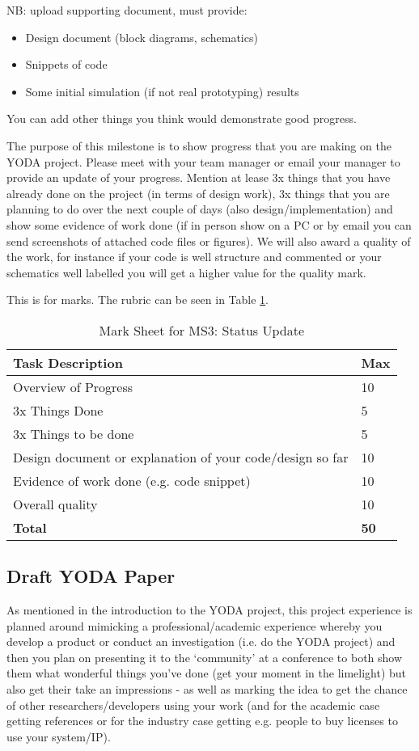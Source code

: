 NB: upload supporting document, must provide:
\begin{itemize}
    \item Design document  (block diagrams, schematics)
    \item Snippets of code
    \item Some initial simulation (if not real prototyping) results
\end{itemize}

You can add other things you think would demonstrate good progress.

The purpose of this milestone is to show progress that you are making on the YODA project. Please meet with your team manager or email your manager to provide an update of your progress. Mention at lease 3x things that you have already done on the project (in terms of design work), 3x things that you are planning to do over the next couple of days (also design/implementation) and show some evidence of work done (if in person show on a PC or by email you can send screenshots of attached code files or figures). We will also award a quality of the work, for instance if your code is well structure and commented or your schematics well labelled you will get a higher value for the quality mark.

This is for marks. The rubric can be seen in Table \ref{tbl:StatusUpdate}.
\begin{table}[H]
\centering
\caption{Mark Sheet for MS3: Status Update}
\label{tbl:StatusUpdate}
\begin{tabular}{|l|l|}
\hline
\textbf{Task Description} & \textbf{Max} \\ \hline
Overview of Progress & 10  \\ \hline
3x Things Done & 5   \\ \hline
3x Things to be done & 5   \\ \hline
Design document or explanation of your code/design so far & 10   \\ \hline
Evidence of work done (e.g. code snippet) & 10   \\ \hline
Overall quality & 10   \\ \hline
\textbf{Total} & \textbf{50}   \\ \hline
\end{tabular}
\end{table}

\subsection{Draft YODA Paper}
\label{ms:draftpaper}
As mentioned in the introduction to the YODA project, this project experience is planned around mimicking a professional/academic experience whereby you develop a product or conduct an investigation (i.e. do the YODA project) and then you plan on presenting it to the `community' at a conference to both show them what wonderful things you've done (get your moment in the limelight) but also get their take an impressions - as well as marking the idea to get the chance of other researchers/developers using your work (and for the academic case getting references or for the industry case getting e.g. people to buy licenses to use your system/IP).  

